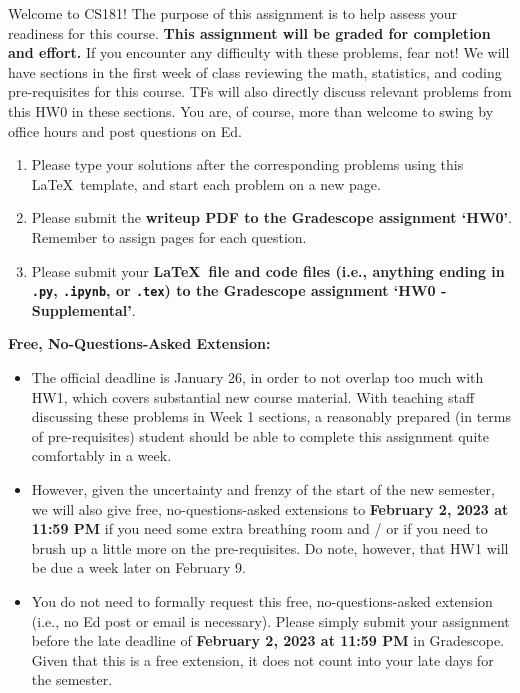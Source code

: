 \documentclass{harvardml}
\theoremstyle{definition}
\theoremstyle{plain}
\begin{document}
\noindent Welcome to CS181! The purpose of this assignment is to help assess your readiness for this course. \textbf{This assignment will be graded for completion and effort.} If you encounter any difficulty with these problems, fear not! We will have sections in the first week of class reviewing the math, statistics, and coding pre-requisites for this course. TFs will also directly discuss relevant problems from this HW0 in these sections. You are, of course, more than welcome to swing by office hours and post questions on Ed.

\begin{enumerate}
    \item Please type your solutions after the corresponding problems using this \LaTeX\ template, and start each problem on a new page.
    \item Please submit the \textbf{writeup PDF to the Gradescope assignment `HW0'}. Remember to assign pages for each question.
    \item Please submit your \textbf{\LaTeX\ file and code files (i.e., anything ending in \texttt{.py}, \texttt{.ipynb}, or \texttt{.tex}) to the Gradescope assignment `HW0 - Supplemental'}. 
\end{enumerate}

\noindent \textbf{Free, No-Questions-Asked Extension:}
\begin{itemize}
    \item The official deadline is January 26, in order to not overlap too much with HW1, which covers substantial new course material. With teaching staff discussing these problems in Week 1 sections, a reasonably prepared (in terms of pre-requisites) student should be able to complete this assignment quite comfortably in a week.
    \item However, given the uncertainty and frenzy of the start of the new semester, we will also give free, no-questions-asked extensions to \textbf{February 2, 2023 at 11:59 PM} if you need some extra breathing room and / or if you need to brush up a little more on the pre-requisites. Do note, however, that HW1 will be due a week later on February 9.
    \item You do not need to formally request this free, no-questions-asked extension (i.e., no Ed post or email is necessary). Please simply submit your assignment before the late deadline of \textbf{February 2, 2023 at 11:59 PM} in Gradescope. Given that this is a free extension, it does not count into your late days for the semester.
\end{itemize}
\end{document}

